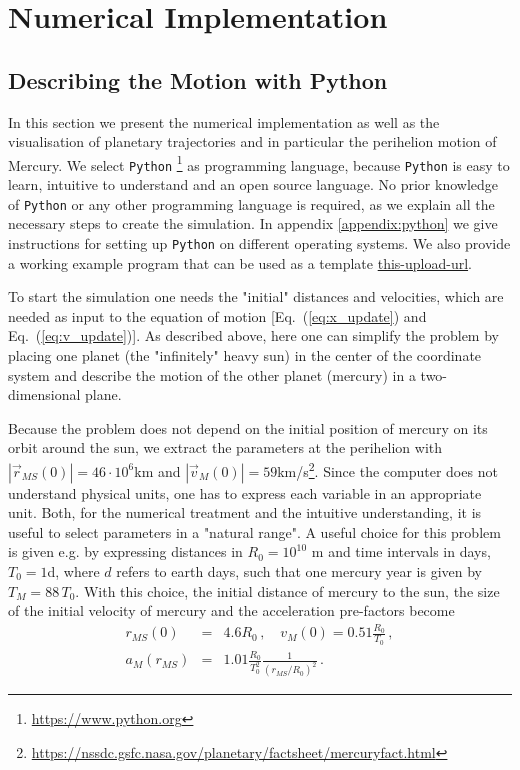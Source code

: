 \documentclass[12pt, UK english]{iopart}
\newcommand{\python}[0]{\texttt{Python} }
\newcommand{\abs}[1]{\left\vert #1 \right\vert}
\begin{document}
\section{Numerical Implementation}\label{sec:Numerical Implementation}

\subsection{Describing the Motion with Python}

In this section we present the numerical implementation as well as the visualisation of planetary trajectories and in
particular
the perihelion motion of Mercury.  We select \python{}\footnote{\url{https://www.python.org}} as  programming language, because \python is easy to learn, intuitive to understand and an open source language.
No prior knowledge of \python or any other programming language is required, as we explain all the necessary steps to create the simulation.
In appendix \ref{appendix:python} we give instructions for setting up \python on different operating systems.
We also provide a working example program that can be used as a template \url{this-upload-url}.

To start the simulation one needs the "initial" distances and velocities, which are needed as input to the equation of motion [Eq.~(\ref{eq:x_update}) and Eq.~(\ref{eq:v_update})].
As described above, here  one can simplify the problem by placing one planet (the "infinitely" heavy sun) in the center of the coordinate system and describe the motion of the other planet (mercury) in a two-dimensional plane.  

Because the problem does not depend on the initial position of mercury on its orbit around the sun, we extract the parameters at the perihelion with $ \abs{\vec r_{MS}(0)} = 46 \cdot 10^6$km and $ \abs{\vec v_M(0)} = 59$km/s\footnote{\url{https://nssdc.gsfc.nasa.gov/planetary/factsheet/mercuryfact.html}}.
Since the computer does not understand physical units, one has to express each variable in an appropriate unit.
Both, for the numerical treatment and the intuitive understanding, it is useful to select parameters in a "natural range".
A useful choice for this problem is given e.g. by expressing distances in $R_0 = 10^{10}$ m and time intervals in days, $T_0 = 1$d, where $d$ refers to earth days, such that one mercury year is given by $T_M=88\,T_0$.
With this choice, the initial distance of mercury to the sun, the size of the initial velocity of mercury and the acceleration pre-factors become
\begin{eqnarray}
r_{MS}(0)   &=& 4.6 R_0 \, , \quad
v_{M}(0)    = 0.51 \frac{R_0}{T_0} \, ,  \\
a_M(r_{MS}) &=& 1.01 \frac{R_0}{T_0^2} \frac{1}{\left(r_{MS}/R_0\right)^2} 
\, .
\end{eqnarray}
\end{document}
